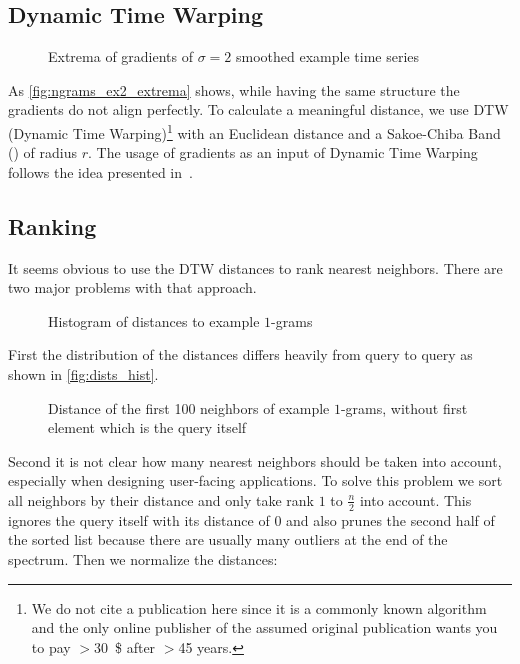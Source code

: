 \subsection{Dynamic Time Warping}
\label{ssec:baseline:sim:dtw}

\begin{figure}
    \centering
    
    \caption{Extrema of gradients of $\sigma = 2$ smoothed example time series}\label{fig:ngrams_ex2_extrema}
\end{figure}

As \autoref{fig:ngrams_ex2_extrema} shows, while having the same structure the gradients do not align perfectly. To calculate a meaningful distance, we use DTW (Dynamic Time Warping)\footnote{We do not cite a publication here since it is a commonly known algorithm and the only online publisher of the assumed original publication wants you to pay $>$\SI{30}{\$} after $>$\num{45} years.} with an Euclidean distance and a Sakoe-Chiba Band (\cite{sakoe}) of radius $r$. The usage of gradients as an input of Dynamic Time Warping follows the idea presented in~\cite{DDTW}.


\subsection{Ranking}
\label{ssec:baseline:sim:rank}

It seems obvious to use the DTW distances to rank nearest neighbors. There are two major problems with that approach.

\begin{figure}
    \centering
    
    \caption{Histogram of distances to example $1$-grams}\label{fig:dists_hist}
\end{figure}

First the distribution of the distances differs heavily from query to query as shown in \autoref{fig:dists_hist}.

\begin{figure}
    \centering
    
    \caption{Distance of the first \num{100} neighbors of example $1$-grams, without first element which is the query itself}\label{fig:dists_sorted}
\end{figure}

Second it is not clear how many nearest neighbors should be taken into account, especially when designing user-facing applications. To solve this problem we sort all neighbors by their distance and only take rank $1$ to $\frac{n}{2}$ into account. This ignores the query itself with its distance of \num{0} and also prunes the second half of the sorted list because there are usually many outliers at the end of the spectrum. Then we normalize the distances:

